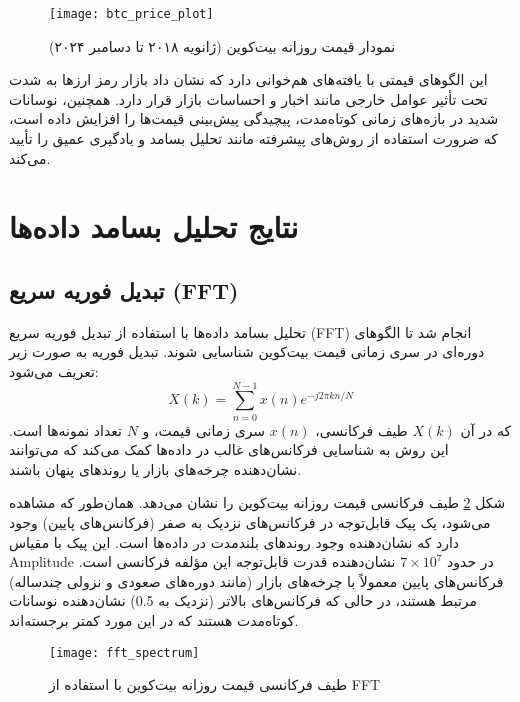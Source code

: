 \begin{figure}[H]
	\centering
	\texttt{[image: btc\_price\_plot]}
	\caption{نمودار قیمت روزانه بیت‌کوین (ژانویه ۲۰۱۸ تا دسامبر ۲۰۲۴)}
	\label{fig:btc_price}
\end{figure}

این الگوهای قیمتی با یافته‌های \cite{urquhart2016inefficiency} هم‌خوانی دارد که نشان داد بازار رمز ارزها به شدت تحت تأثیر عوامل خارجی مانند اخبار و احساسات بازار قرار دارد. همچنین، نوسانات شدید در بازه‌های زمانی کوتاه‌مدت، پیچیدگی پیش‌بینی قیمت‌ها را افزایش داده است، که ضرورت استفاده از روش‌های پیشرفته مانند تحلیل بسامد و یادگیری عمیق را تأیید می‌کند.

\section{نتایج تحلیل بسامد داده‌ها}
\label{sec:frequency_results}

\subsection{تبدیل فوریه سریع (FFT)}
تحلیل بسامد داده‌ها با استفاده از تبدیل فوریه سریع (FFT) انجام شد تا الگوهای دوره‌ای در سری زمانی قیمت بیت‌کوین شناسایی شوند. تبدیل فوریه به صورت زیر تعریف می‌شود:
\begin{equation}
	X(k) = \sum_{n=0}^{N-1} x(n) e^{-j2\pi kn/N}
\end{equation}
که در آن \(X(k)\) طیف فرکانسی، \(x(n)\) سری زمانی قیمت، و \(N\) تعداد نمونه‌ها است. این روش به شناسایی فرکانس‌های غالب در داده‌ها کمک می‌کند که می‌توانند نشان‌دهنده چرخه‌های بازار یا روندهای پنهان باشند.

شکل \ref{fig:fft_spectrum} طیف فرکانسی قیمت روزانه بیت‌کوین را نشان می‌دهد. همان‌طور که مشاهده می‌شود، یک پیک قابل‌توجه در فرکانس‌های نزدیک به صفر (فرکانس‌های پایین) وجود دارد که نشان‌دهنده وجود روندهای بلندمدت در داده‌ها است. این پیک با مقیاس Amplitude در حدود \(7 \times 10^7\) نشان‌دهنده قدرت قابل‌توجه این مؤلفه فرکانسی است. فرکانس‌های پایین معمولاً با چرخه‌های بازار (مانند دوره‌های صعودی و نزولی چندساله) مرتبط هستند، در حالی که فرکانس‌های بالاتر (نزدیک به 0.5) نشان‌دهنده نوسانات کوتاه‌مدت هستند که در این مورد کمتر برجسته‌اند.

\begin{figure}[H]
	\centering
	\texttt{[image: fft\_spectrum]}
	\caption{طیف فرکانسی قیمت روزانه بیت‌کوین با استفاده از FFT}
	\label{fig:fft_spectrum}
\end{figure}

